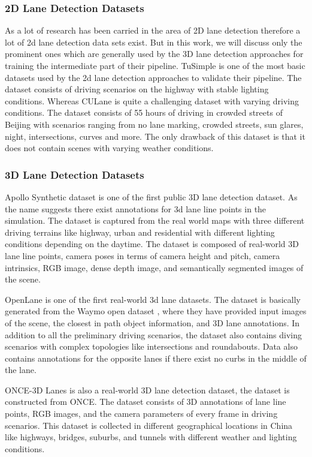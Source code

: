 \subsubsection{2D Lane Detection Datasets}
As a lot of research has been carried in the area of 2D lane detection therefore a lot of 2d lane detection data sets exist. But in this work, we will discuss only the prominent ones which are generally used by the 3D lane detection approaches for training the intermediate part of their pipeline. \cite{Tusimple} TuSimple is one of the most basic datasets used by the 2d lane detection approaches to validate their pipeline. The dataset consists of driving scenarios on the highway with stable lighting conditions. Whereas CULane \cite{pan2018SCNN} is quite a challenging dataset with varying driving conditions. The dataset consists of 55 hours of driving in crowded streets of Beijing with scenarios ranging from no lane marking, crowded streets, sun glares, night, intersections, curves and more. The only drawback of this dataset is that it does not contain scenes with varying weather conditions.

\subsubsection{3D Lane Detection Datasets}
Apollo Synthetic dataset\cite{guo2020gen} is one of the first public 3D lane detection dataset. As the name suggests there exist annotations for 3d lane line points in the simulation. The dataset is captured from the real world maps with three different driving terrains like highway, urban and residential with different lighting conditions depending on the daytime. The dataset is composed of real-world 3D lane line points, camera poses in terms of camera height and pitch, camera intrinsics, RGB image, dense depth image, and semantically segmented images of the scene.

OpenLane \cite{chen2022persformer} is one of the first real-world 3d lane datasets. The dataset is basically generated from the Waymo open dataset \cite{Sun_2020_CVPR}, where they have provided input images of the scene, the closest in path object information, and 3D lane annotations. In addition to all the preliminary driving scenarios, the dataset also contains diving scenarios with complex topologies like intersections and roundabouts. Data also contains annotations for the opposite lanes if there exist no curbs in the middle of the lane. 

ONCE-3D Lanes \cite{yan2022once} is also a real-world 3D lane detection dataset, the dataset is constructed from ONCE\cite{mao2021one}. The dataset consists of 3D annotations of lane line points, RGB images, and the camera parameters of every frame in driving scenarios. This dataset is collected in different geographical locations in China like highways, bridges, suburbs, and tunnels with different weather and lighting conditions.


